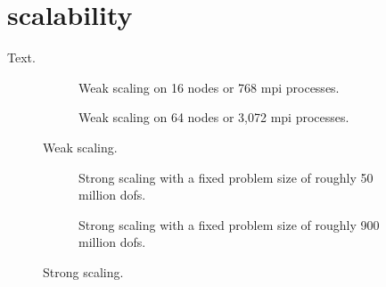 \section{ scalability}
\label{sec:scaling}

Text.

\begin{figure}
\begin{subfigure}{1\textwidth}
  \centering
  
  \caption{Weak scaling on 16 nodes or 768 \gls{mpi} processes.}
  \label{fig:weak-nodes16}
\end{subfigure}
\begin{subfigure}{1\textwidth}
  \centering
  
  \caption{Weak scaling on 64 nodes or 3,072 \gls{mpi} processes.}
  \label{fig:weak-nodes64}
\end{subfigure}
\caption{Weak scaling.}
\label{fig:weak}
\end{figure}

\begin{figure}
\begin{subfigure}{1\textwidth}
  \centering
  
  \caption{Strong scaling with a fixed problem size of roughly 50 million \glspl{dof}.}
  \label{fig:strong-nrefs10}
\end{subfigure}
\begin{subfigure}{1\textwidth}
  \centering
  
  \caption{Strong scaling with a fixed problem size of roughly 900 million \glspl{dof}.}
  \label{fig:strong-nrefs12}
\end{subfigure}
\caption{Strong scaling.}
\label{fig:strong}
\end{figure}